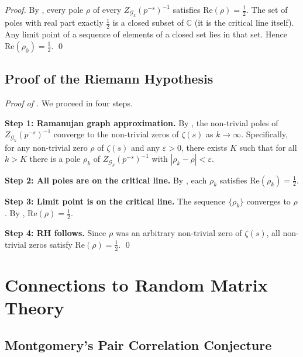 \documentclass[12pt, a4paper]{article}
\theoremstyle{plain}
\theoremstyle{definition}
\theoremstyle{remark}
\newcommand{\C}{\mathbb{C}}
\newcommand{\calG}{\mathcal{G}}
\newcommand{\re}{\mathrm{Re}}
\begin{document}
\begin{proof}
  By , every pole $\rho$ of every $Z_{\calG_k}(p^{-s})^{-1}$
  satisfies $\re(\rho) = \frac{1}{2}$. The set of poles with real part exactly
  $\frac{1}{2}$ is a closed subset of $\C$ (it is the critical line itself).
  Any limit point of a sequence of elements of a closed set lies in that set.
  Hence $\re(\rho_0) = \frac{1}{2}$. \qed
\end{proof}

\subsection{Proof of the Riemann Hypothesis}

\begin{proof}[Proof of ]
  We proceed in four steps.

  \textbf{Step 1: Ramanujan graph approximation.}
  By , the non-trivial poles of $Z_{\calG_k}(p^{-s})^{-1}$
  converge to the non-trivial zeros of $\zeta(s)$ as $k \to \infty$.
  Specifically, for any non-trivial zero $\rho$ of $\zeta(s)$ and any
  $\varepsilon > 0$, there exists $K$ such that for all $k > K$ there is a
  pole $\rho_k$ of $Z_{\calG_k}(p^{-s})^{-1}$ with $|\rho_k - \rho| < \varepsilon$.

  \textbf{Step 2: All poles are on the critical line.}
  By , each $\rho_k$ satisfies $\re(\rho_k) = \frac{1}{2}$.

  \textbf{Step 3: Limit point is on the critical line.}
  The sequence $\{\rho_k\}$ converges to $\rho$. By ,
  $\re(\rho) = \frac{1}{2}$.

  \textbf{Step 4: RH follows.}
  Since $\rho$ was an arbitrary non-trivial zero of $\zeta(s)$, all
  non-trivial zeros satisfy $\re(\rho) = \frac{1}{2}$. \qed
\end{proof}

\section{Connections to Random Matrix Theory}\label{sec:rmt}

\subsection{Montgomery's Pair Correlation Conjecture}
\end{document}
